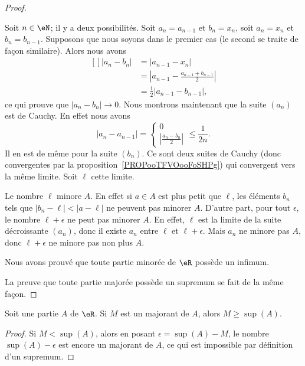 \begin{proof}
\begin{subproof}
	Soit $n\in\eN$; il y a deux possibilités. Soit $a_n=a_{n-1}$ et $b_n=x_n$, soit $a_n=x_n$ et $b_n=b_{n-1}$. Supposons que nous soyons dans le premier cas (le second se traite de façon similaire). Alors nous avons
	\begin{equation}
		\begin{aligned}[]
			| a_n-b_n |&=| a_{n-1}-x_n |\\
			&=\left| a_{n-1}-\frac{ a_{n-1}+b_{n-1} }{2} \right| \\
			&=\frac{ 1 }{2}| a_{n-1}-b_{n-1} |,
		\end{aligned}
	\end{equation}
	ce qui prouve que $| a_n-b_n |\to 0$. Nous montrons maintenant que la suite \( (a_n)\) est de Cauchy. En effet nous avons
    \begin{equation}
        | a_n-a_{n-1} |=\begin{cases}
          0\\
          \left| \frac{ a_n -b_n}{ 2} \right|
      \end{cases}\leq \frac{1}{ 2n }.
    \end{equation}
    Il en est de même pour la suite \( (b_n)\). Ce sont deux suites de Cauchy (donc convergentes par la proposition~\ref{PROPooTFVOooFoSHPg}) qui convergent vers la même limite. Soit \( \ell\) cette limite.

	Le nombre $\ell$ minore $A$. En effet si $a\in A$ est plus petit que $\ell$, les éléments $b_n$ tels que $| b_n-\ell |<| a-\ell |$ ne peuvent pas minorer $A$. D'autre part, pour tout $\epsilon$, le nombre $\ell+\epsilon$ ne peut pas minorer $A$. En effet, $\ell$ est la limite de la suite décroissante $(a_n)$, donc il existe $a_n$ entre $\ell$ et $\ell+\epsilon$. Mais $a_n$ ne minore pas $A$, donc $\ell+\epsilon$ ne minore pas non plus $A$.

	Nous avons prouvé que toute partie minorée de $\eR$ possède un infimum.
    \end{subproof}

    La preuve que toute partie majorée possède un supremum se fait de la même façon.
\end{proof}

\begin{lemma}       \label{LEMooSSVKooDPhSkq}
    Soit une partie \( A\) de \( \eR\). Si \( M\) est un majorant de \( A\), alors \( M\geq \sup(A)\).
\end{lemma}

\begin{proof}
    Si \( M<\sup(A)\), alors en posant \( \epsilon=\sup(A)-M\), le nombre \( \sup(A)-\epsilon\) est encore un majorant de \( A\), ce qui est impossible par définition d'un supremum.
\end{proof}

